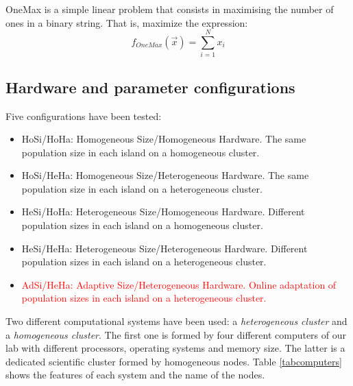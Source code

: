 \documentclass[final,1p,times]{elsarticle}
\begin{document}
OneMax is a simple linear problem that consists in maximising the number of ones in a binary string. That is, maximize the expression:
\begin{equation}
f_{OneMax}(\vec{x}) = \sum_{i=1}^{N}{x_{i}}
\end{equation}

\subsection{Hardware and parameter configurations}

Five configurations have been tested:

\begin{itemize}
\item HoSi/HoHa: Homogeneous Size/Homogeneous Hardware. The same population size in each island on a homogeneous cluster.
\item HoSi/HeHa: Homogeneous Size/Heterogeneous Hardware. The same population size in each island on a heterogeneous cluster.
\item HeSi/HoHa: Heterogeneous Size/Homogeneous Hardware. Different population sizes in each island on a homogeneous cluster.
\item HeSi/HeHa: Heterogeneous Size/Heterogeneous Hardware. Different population sizes in each island on a heterogeneous cluster.
\item \textcolor{red}{AdSi/HeHa: Adaptive Size/Heterogeneous Hardware. Online adaptation of population sizes in each island on a heterogeneous cluster.}
\end{itemize}

Two different computational systems have been used: a {\em heterogeneous cluster} and a {\em homogeneous cluster}. The first one is formed by four different computers of our lab with different processors, operating systems and memory size. The latter is a dedicated scientific cluster formed by homogeneous nodes. Table \ref{tabcomputers} shows the features of each system and the name of the nodes.
\end{document}
